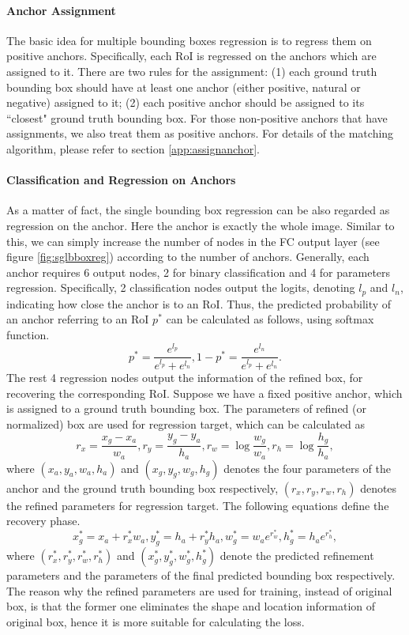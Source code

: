 \paragraph{Anchor Assignment}
The basic idea for multiple bounding boxes regression is to regress them on positive anchors. Specifically, each RoI is regressed on the anchors which are assigned to it. There are two rules for the assignment: (1) each ground truth bounding box should have at least one anchor (either positive, natural or negative) assigned to it; (2) each positive anchor should be assigned to its ``closest" ground truth bounding box. For those non-positive anchors that have assignments, we also treat them as positive anchors. For details of the matching algorithm, please refer to section \ref{app:assignanchor}.

\paragraph{Classification and Regression on Anchors}
As a matter of fact, the single bounding box regression can be also regarded as regression on the anchor. Here the anchor is exactly the whole image. Similar to this, we can simply increase the number of nodes in the FC output layer (see figure \ref{fig:sglbboxreg}) according to the number of anchors. Generally, each anchor requires 6 output nodes, 2 for binary classification and 4 for parameters regression. Specifically, 2 classification nodes output the logits, denoting $l_p$ and $l_n$, indicating how close the anchor is to an RoI. Thus, the predicted probability of an anchor referring to an RoI $p^*$ can be calculated as follows, using softmax function.
\begin{equation}
	p^* = \frac{e^{l_p}}{e^{l_p} + e^{l_n}}, 1 - p^* = \frac{e^{l_n}}{e^{l_p} + e^{l_n}}.
\end{equation}
The rest 4 regression nodes output the information of the refined box, for recovering the corresponding RoI. Suppose we have a fixed positive anchor, which is assigned to a ground truth bounding box. The parameters of refined (or normalized) box are used for regression target, which can be calculated as
\begin{equation}
	r_x = \frac{x_g - x_a}{w_a}, r_y = \frac{y_g - y_a}{h_a}, r_w = \log\frac{w_g}{w_a}, r_h = \log\frac{h_g}{h_a},
\end{equation}
where $(x_a, y_a, w_a, h_a)$ and $(x_g, y_g, w_g, h_g)$ denotes the four parameters of the anchor and the ground truth bounding box respectively, $(r_x, r_y, r_w, r_h)$ denotes the refined parameters for regression target. The following equations define the recovery phase.
\begin{equation}
	x_g^* = x_a + r_x^*w_a, y_g^* = h_a + r_y^*h_a, w_g^* = w_ae^{r_w^*}, h_g^* = h_ae^{r_h^*},
\end{equation}
where $(r_x^*, r_y^*, r_w^*, r_h^*)$ and $(x_g^*, y_g^*, w_g^*, h_g^*)$ denote the predicted refinement parameters and the parameters of the final predicted bounding box respectively. The reason why the refined parameters are used for training, instead of original box, is that the former one eliminates the shape and location information of original box, hence it is more suitable for calculating the loss.

